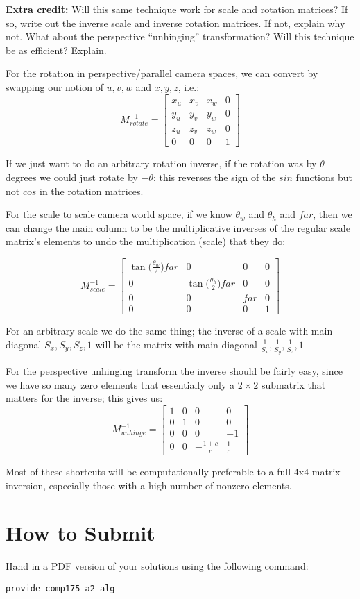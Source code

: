 \documentclass[10pt,twocolumn]{article}
\begin{document}
{\bf Extra credit:} Will this same technique work for scale and rotation matrices? If so, write out the inverse scale and inverse rotation matrices. If not, explain why not. What about the perspective ``unhinging'' transformation? Will this technique be as efficient? Explain.
\begin{framed}
For the rotation in perspective/parallel camera spaces, we can convert by swapping our notion of $u, v, w$ and $x, y, z$, i.e.:
\[M_{rotate}^{-1} = \begin{bmatrix}
    x_u & x_v & x_w & 0 \\
    y_u & y_v & y_w & 0 \\
    z_u & z_v & z_w & 0 \\
    0 & 0 & 0 & 1
\end{bmatrix}\]

If we just want to do an arbitrary rotation inverse, if the rotation was by $\theta$ degrees we could just rotate by $-\theta$; this reverses the sign of the $sin$ functions but not $cos$ in the rotation matrices.

For the scale to scale camera world space, if we know $\theta_w$ and $\theta_h$ and $far$, then we can change the main column to be the multiplicative inverses of the regular scale matrix's elements to undo the multiplication (scale) that they do:

\[M_{scale}^{-1} = \begin{bmatrix}
    \tan\big(\frac{\theta_w}{2}\big) far & 0 & 0 & 0 \\
    0 & \tan\big(\frac{\theta_h}{2}\big) far & 0 & 0 \\
    0 & 0 & far & 0 \\
    0 & 0 & 0 & 1
\end{bmatrix}\]

For an arbitrary scale we do the same thing; the inverse of a scale with main diagonal $S_x, S_y, S_z, 1$ will be the matrix with main diagonal $\frac{1}{S_x}, \frac{1}{S_y}, \frac{1}{S_z}, 1$

For the perspective unhinging transform the inverse should be fairly easy, since we have so many zero elements that essentially only a $2\times 2$ submatrix that matters for the inverse; this gives us:
\[M_{unhinge}^{-1} = \begin{bmatrix}
    1 & 0 & 0 & 0 \\
    0 & 1 & 0 & 0 \\
    0 & 0 & 0 & -1 \\
    0 & 0 & -\frac{1+c}{c} & \frac{1}{c}
\end{bmatrix}\]

Most of these shortcuts will be computationally preferable to a full 4x4 matrix inversion, especially those with a high number of nonzero elements.
\end{framed}

\section{How to Submit}

Hand in a PDF version of your solutions using the following command:
\begin{center}
 {\tt provide comp175 a2-alg}
 \end{center}
\end{document}
